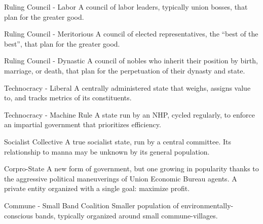  Ruling Council - Labor                                A council of labor leaders, typically union
                                                       bosses, that plan for the greater good.

 Ruling Council - Meritorious                          A council of elected representatives, the
                                                       “best of the best”, that plan for the greater
                                                       good.

 Ruling Council - Dynastic                             A council of nobles who inherit their position
                                                       by birth, marriage, or death, that plan for the
                                                       perpetuation of their dynasty and state.

 Technocracy - Liberal                                 A centrally administered state that weighs,
                                                       assigns value to, and tracks metrics of its
                                                       constituents.

 Technocracy - Machine Rule                            A state run by an NHP, cycled regularly, to
                                                       enforce an impartial government that
                                                       prioritizes efficiency.

 Socialist Collective                                  A true socialist state, run by a central
                                                       committee. Its relationship to manna may be
                                                       unknown by its general population.

 Corpro-State                                          A new form of government, but one growing
                                                       in popularity thanks to the aggressive political
                                                       maneuverings of Union Economic Bureau
                                                       agents. A private entity organized with a
                                                       single goal: maximize profit.

 Commune - Small Band Coalition                        Smaller population of environmentally-
                                                       conscious bands, typically organized around
                                                       small commune-villages.

